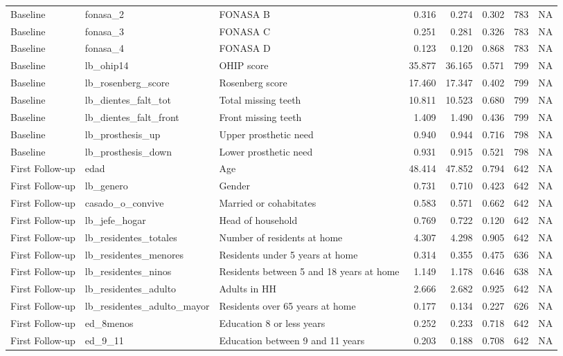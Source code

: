 \begin{table}
\begin{tabular}[t]{lllrrrrr}
Baseline & fonasa\_2 & FONASA B & 0.316 & 0.274 & 0.302 & 783 & NA\\
Baseline & fonasa\_3 & FONASA C & 0.251 & 0.281 & 0.326 & 783 & NA\\
\addlinespace
Baseline & fonasa\_4 & FONASA D & 0.123 & 0.120 & 0.868 & 783 & NA\\
Baseline & lb\_ohip14 & OHIP score & 35.877 & 36.165 & 0.571 & 799 & NA\\
Baseline & lb\_rosenberg\_score & Rosenberg score & 17.460 & 17.347 & 0.402 & 799 & NA\\
Baseline & lb\_dientes\_falt\_tot & Total missing teeth & 10.811 & 10.523 & 0.680 & 799 & NA\\
Baseline & lb\_dientes\_falt\_front & Front missing teeth & 1.409 & 1.490 & 0.436 & 799 & NA\\
\addlinespace
Baseline & lb\_prosthesis\_up & Upper prosthetic need & 0.940 & 0.944 & 0.716 & 798 & NA\\
Baseline & lb\_prosthesis\_down & Lower prosthetic need & 0.931 & 0.915 & 0.521 & 798 & NA\\
First Follow-up & edad & Age & 48.414 & 47.852 & 0.794 & 642 & NA\\
First Follow-up & lb\_genero & Gender & 0.731 & 0.710 & 0.423 & 642 & NA\\
First Follow-up & casado\_o\_convive & Married or cohabitates & 0.583 & 0.571 & 0.662 & 642 & NA\\
\addlinespace
First Follow-up & lb\_jefe\_hogar & Head of household & 0.769 & 0.722 & 0.120 & 642 & NA\\
First Follow-up & lb\_residentes\_totales & Number of residents at home & 4.307 & 4.298 & 0.905 & 642 & NA\\
First Follow-up & lb\_residentes\_menores & Residents under 5 years at home & 0.314 & 0.355 & 0.475 & 636 & NA\\
First Follow-up & lb\_residentes\_ninos & Residents between 5 and 18 years at home & 1.149 & 1.178 & 0.646 & 638 & NA\\
First Follow-up & lb\_residentes\_adulto & Adults in HH & 2.666 & 2.682 & 0.925 & 642 & NA\\
\addlinespace
First Follow-up & lb\_residentes\_adulto\_mayor & Residents over 65 years at home & 0.177 & 0.134 & 0.227 & 626 & NA\\
First Follow-up & ed\_8menos & Education 8 or less years & 0.252 & 0.233 & 0.718 & 642 & NA\\
First Follow-up & ed\_9\_11 & Education between 9 and 11 years & 0.203 & 0.188 & 0.708 & 642 & NA\\

\end{tabular}
\end{table}
